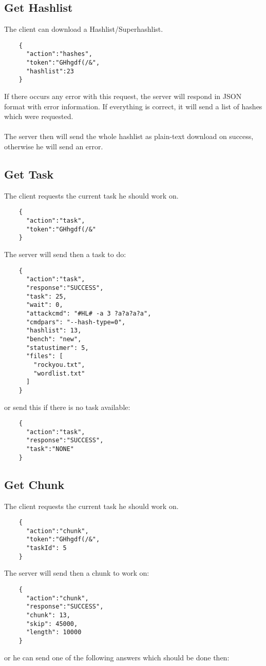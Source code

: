 \documentclass{article}
\begin{document}
	\subsection*{Get Hashlist}
	The client can download a Hashlist/Superhashlist.
	\begin{verbatim}
	{
	  "action":"hashes",
	  "token":"GHhgdf(/&",
	  "hashlist":23
	}
	\end{verbatim}
	If there occurs any error with this request, the server will respond in JSON format with error information. If everything is correct, it will send a list of hashes which were requested.\\\\
	The server then will send the whole hashlist as plain-text download on success, otherwise he will send an error.
	
	\subsection*{Get Task}
	The client requests the current task he should work on.
	\begin{verbatim}
	{
	  "action":"task",
	  "token":"GHhgdf(/&"
	}
	\end{verbatim}
	The server will send then a task to do:
	\begin{verbatim}
	{
	  "action":"task",
	  "response":"SUCCESS",
	  "task": 25,
	  "wait": 0,
	  "attackcmd": "#HL# -a 3 ?a?a?a?a",
	  "cmdpars": "--hash-type=0",
	  "hashlist": 13,
	  "bench": "new",
	  "statustimer": 5,
	  "files": [
	    "rockyou.txt",
	    "wordlist.txt"
	  ]
	}
	\end{verbatim}
	or send this if there is no task available:
	\begin{verbatim}
	{
	  "action":"task",
	  "response":"SUCCESS",
	  "task":"NONE"
	}
	\end{verbatim}
	
	\subsection*{Get Chunk}
	The client requests the current task he should work on.
	\begin{verbatim}
	{
	  "action":"chunk", 
	  "token":"GHhgdf(/&",
	  "taskId": 5
	}
	\end{verbatim}
	The server will send then a chunk to work on:
	\begin{verbatim}
	{
	  "action":"chunk",
	  "response":"SUCCESS",
	  "chunk": 13,
	  "skip": 45000,
	  "length": 10000
	}
	\end{verbatim}
	or he can send one of the following answers which should be done then:
	
\end{document}
